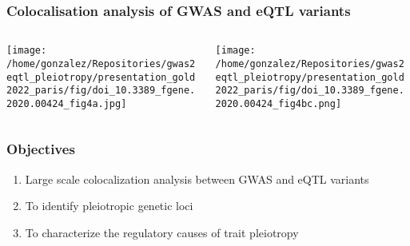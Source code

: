 \documentclass{beamer}
\begin{document}
\begin{frame}
\frametitle{Colocalisation analysis of GWAS and eQTL variants}

\begin{columns}
\begin{column}{0.5\textwidth}
    \begin{center}
\texttt{[image: /home/gonzalez/Repositories/gwas2eqtl\_pleiotropy/presentation\_gold2022\_paris/fig/doi\_10.3389\_fgene.2020.00424\_fig4a.jpg]}
     \end{center}
\end{column}
\begin{column}{0.5\textwidth}
    \begin{center}
\texttt{[image: /home/gonzalez/Repositories/gwas2eqtl\_pleiotropy/presentation\_gold2022\_paris/fig/doi\_10.3389\_fgene.2020.00424\_fig4bc.png]}
     \end{center}
\end{column}
\end{columns}

\let\thefootnote\relax{}
\end{frame}

\begin{frame}
\frametitle{Objectives}

\begin{enumerate}
\item Large scale colocalization analysis between GWAS and eQTL variants
\item To identify pleiotropic genetic loci
\item To characterize the regulatory causes of trait pleiotropy
\end{enumerate}
\end{frame}
\end{document}
